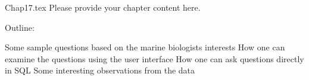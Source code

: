 Chap17.tex
Please provide your chapter content here. 

Outline: 

Some sample questions based on the marine biologists interests
How one can examine the questions using the user interface
How one can ask questions directly in SQL
Some interesting observations from the data 
